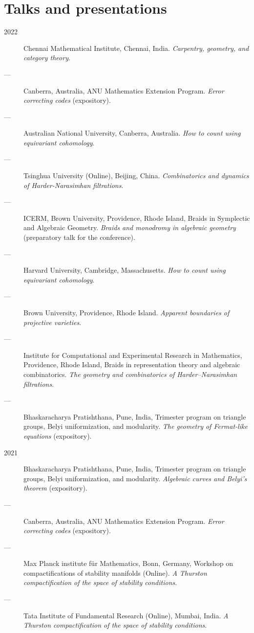 \documentclass[11pt]{article}
\begin{document}
\section*{Talks and presentations}
\label{sec:orgd830daf}
\begin{description}
\item[{2022}] Chennai Mathematical Institute, Chennai, India. \emph{Carpentry, geometry, and category theory}.
\item[{---}] Canberra, Australia, ANU Mathematics Extension Program. \emph{Error correcting codes} (expository).
\item[{---}] Australian National University, Canberra, Australia. \emph{How to count using equivariant cohomology}.
\item[{---}] Tsinghua University (Online), Beijing, China. \emph{Combinatorics and dynamics of Harder-Narasimhan filtrations}.
\item[{---}] ICERM, Brown University, Providence, Rhode Island, Braids in Symplectic and Algebraic Geometry. \emph{Braids and monodromy in algebraic geometry} (preparatory talk for the conference).
\item[{---}] Harvard University, Cambridge, Massachusetts. \emph{How to count using equivariant cohomology}.
\item[{---}] Brown University, Providence, Rhode Island. \emph{Apparent boundaries of projective varieties}.
\item[{---}] Institute for Computational and Experimental Research in Mathematics, Providence, Rhode Island, Braids in representation theory and algebraic combinatorics. \emph{The geometry and combinatorics of Harder--Narasimhan filtrations}.
\item[{---}] Bhaskaracharya Pratishthana, Pune, India, Trimester program on triangle groups, Belyi uniformization, and modularity. \emph{The geometry of Fermat-like equations} (expository).
\item[{2021}] Bhaskaracharya Pratishthana, Pune, India, Trimester program on triangle groups, Belyi uniformization, and modularity. \emph{Algebraic curves and Belyi's theorem} (expository).
\item[{---}] Canberra, Australia, ANU Mathematics Extension Program. \emph{Error correcting codes} (expository).
\item[{---}] Max Planck institute für Mathematics, Bonn, Germany, Workshop on compactifications of stability manifolds (Online). \emph{A Thurston compactification of the space of stability conditions}.
\item[{---}] Tata Institute of Fundamental Research (Online), Mumbai, India. \emph{A Thurston compactification of the space of stability conditions}.

\end{description}
\end{document}
